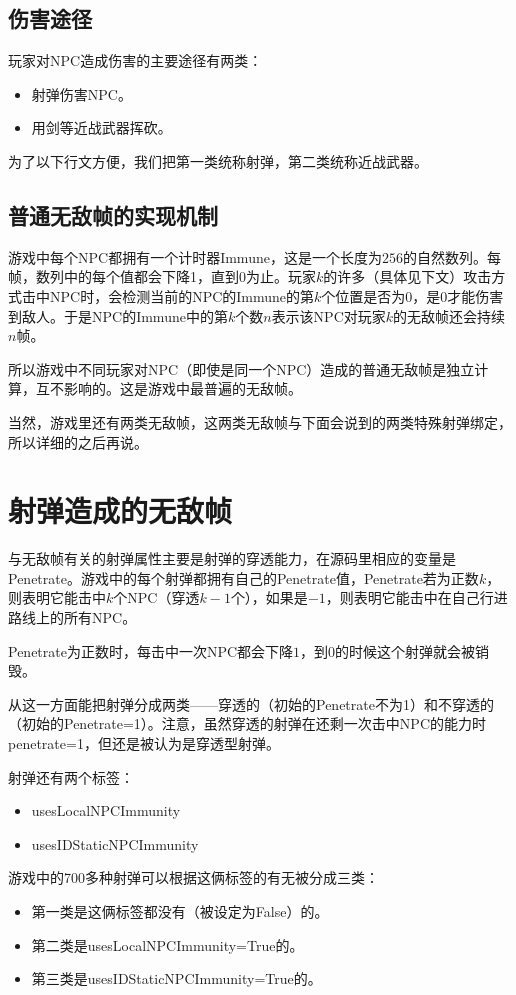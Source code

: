 \subsection{伤害途径}
玩家对NPC造成伤害的主要途径有两类：
\begin{itemize}
\item 射弹伤害NPC。
\item 用剑等近战武器挥砍。
\end{itemize}

为了以下行文方便，我们把第一类统称射弹，第二类统称近战武器。

\subsection{普通无敌帧的实现机制}
游戏中每个NPC都拥有一个计时器Immune，这是一个长度为$256$的自然数列。每帧，数列中的每个值都会下降1，直到0为止。玩家$k$的许多（具体见下文）攻击方式击中NPC时，会检测当前的NPC的Immune的第$k$个位置是否为$0$，是$0$才能伤害到敌人。于是NPC的Immune中的第$k$个数$n$表示该NPC对玩家$k$的无敌帧还会持续$n$帧。

所以游戏中不同玩家对NPC（即使是同一个NPC）造成的普通无敌帧是独立计算，互不影响的。这是游戏中最普遍的无敌帧。

当然，游戏里还有两类无敌帧，这两类无敌帧与下面会说到的两类特殊射弹绑定，所以详细的之后再说。

\section{射弹造成的无敌帧}
与无敌帧有关的射弹属性主要是射弹的穿透能力，在源码里相应的变量是Penetrate。游戏中的每个射弹都拥有自己的Penetrate值，Penetrate若为正数$k$，则表明它能击中$k$个NPC（穿透$k-1$个），如果是$-1$，则表明它能击中在自己行进路线上的所有NPC。

Penetrate为正数时，每击中一次NPC都会下降$1$，到$0$的时候这个射弹就会被销毁。

从这一方面能把射弹分成两类——穿透的（初始的Penetrate不为1）和不穿透的（初始的Penetrate=1）。注意，虽然穿透的射弹在还剩一次击中NPC的能力时penetrate=1，但还是被认为是穿透型射弹。

射弹还有两个标签：
\begin{itemize}
\item usesLocalNPCImmunity
\item usesIDStaticNPCImmunity
\end{itemize}

游戏中的700多种射弹可以根据这俩标签的有无被分成三类：
\begin{itemize}
\item 第一类是这俩标签都没有（被设定为False）的。
\item 第二类是usesLocalNPCImmunity=True的。
\item 第三类是usesIDStaticNPCImmunity=True的。
\end{itemize}

